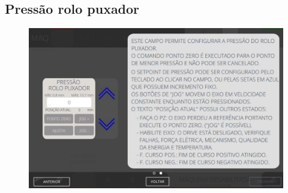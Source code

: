 \newpage
\thispagestyle{fancy}
\vspace*{40 pt}
\subsection{Pressão rolo puxador}
\vspace*{\fill}
\begin{figure}[h]
    \centering
    \includegraphics[width=576 px,height=360 px]{src/imagesICV/03-feeder/settings/3.png}
\end{figure}
\vspace*{\fill}
